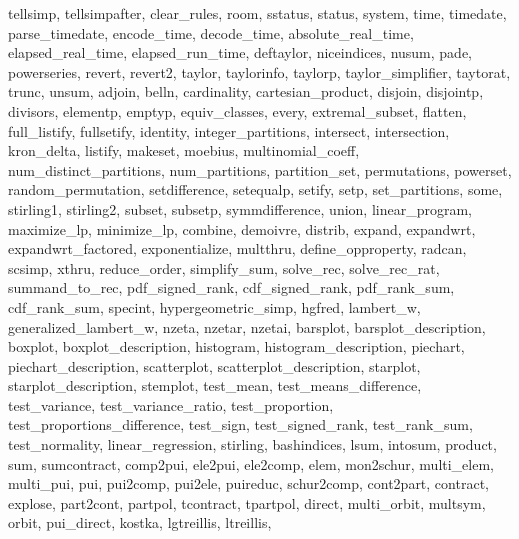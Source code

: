 {{    tellsimp,
    tellsimpafter,
    clear_rules,
    room,
    sstatus,
    status,
    system,
    time,
    timedate,
    parse_timedate,
    encode_time,
    decode_time,
    absolute_real_time,
    elapsed_real_time,
    elapsed_run_time,
    deftaylor,
    niceindices,
    nusum,
    pade,
    powerseries,
    revert,
    revert2,
    taylor,
    taylorinfo,
    taylorp,
    taylor_simplifier,
    taytorat,
    trunc,
    unsum,
    adjoin,
    belln,
    cardinality,
    cartesian_product,
    disjoin,
    disjointp,
    divisors,
    elementp,
    emptyp,
    equiv_classes,
    every,
    extremal_subset,
    flatten,
    full_listify,
    fullsetify,
    identity,
    integer_partitions,
    intersect,
    intersection,
    kron_delta,
    listify,
    makeset,
    moebius,
    multinomial_coeff,
    num_distinct_partitions,
    num_partitions,
    partition_set,
    permutations,
    powerset,
    random_permutation,
    setdifference,
    setequalp,
    setify,
    setp,
    set_partitions,
    some,
    stirling1,
    stirling2,
    subset,
    subsetp,
    symmdifference,
    union,
    linear_program,
    maximize_lp,
    minimize_lp,
    combine,
    demoivre,
    distrib,
    expand,
    expandwrt,
    expandwrt_factored,
    exponentialize,
    multthru,
    define_opproperty,
    radcan,
    scsimp,
    xthru,
    reduce_order,
    simplify_sum,
    solve_rec,
    solve_rec_rat,
    summand_to_rec,
    pdf_signed_rank,
    cdf_signed_rank,
    pdf_rank_sum,
    cdf_rank_sum,
    specint,
    hypergeometric_simp,
    hgfred,
    lambert_w,
    generalized_lambert_w,
    nzeta,
    nzetar,
    nzetai,
    barsplot,
    barsplot_description,
    boxplot,
    boxplot_description,
    histogram,
    histogram_description,
    piechart,
    piechart_description,
    scatterplot,
    scatterplot_description,
    starplot,
    starplot_description,
    stemplot,
    test_mean,
    test_means_difference,
    test_variance,
    test_variance_ratio,
    test_proportion,
    test_proportions_difference,
    test_sign,
    test_signed_rank,
    test_rank_sum,
    test_normality,
    linear_regression,
    stirling,
    bashindices,
    lsum,
    intosum,
    product,
    sum,
    sumcontract,
    comp2pui,
    ele2pui,
    ele2comp,
    elem,
    mon2schur,
    multi_elem,
    multi_pui,
    pui,
    pui2comp,
    pui2ele,
    puireduc,
    schur2comp,
    cont2part,
    contract,
    explose,
    part2cont,
    partpol,
    tcontract,
    tpartpol,
    direct,
    multi_orbit,
    multsym,
    orbit,
    pui_direct,
    kostka,
    lgtreillis,
    ltreillis,
}}

